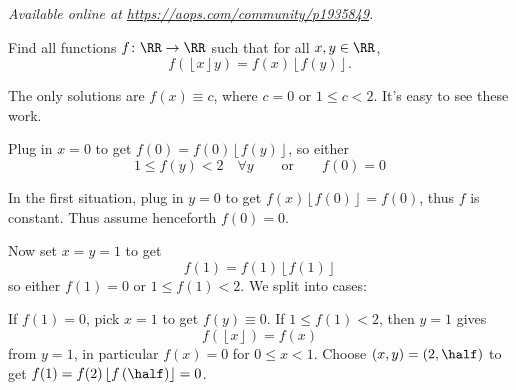\textsl{Available online at \url{https://aops.com/community/p1935849}.}
\begin{mdframed}[style=mdpurplebox,frametitle={Problem statement}]
Find all functions $f \colon \RR \to \RR$ such that for all $x,y \in \RR$,
\[ f(\left\lfloor x\right\rfloor y) = f(x)\left\lfloor f(y)\right\rfloor. \]
\end{mdframed}
The only solutions are $f(x) \equiv c$,
where $c = 0$ or $1 \le c < 2$.
It's easy to see these work.

Plug in $x=0$ to get $f(0) = f(0) \left\lfloor f(y) \right\rfloor$,
so either
\[ 1 \le f(y) < 2 \quad \forall y
  \qquad\text{or}\qquad f(0) = 0 \]

In the first situation,
plug in $y=0$ to get $f(x) \left\lfloor f(0) \right\rfloor = f(0)$,
thus $f$ is constant.
Thus assume henceforth $f(0) = 0$.

Now set $x=y=1$ to get
\[ f(1) = f(1) \left\lfloor f(1) \right\rfloor \]
so either $f(1) = 0$ or $1 \le f(1) < 2$.
We split into cases:
\begin{itemize}
  \ii If $f(1) = 0$, pick $x=1$ to get $f(y) \equiv 0$.
  \ii If $1 \le f(1) < 2$,
  then $y=1$ gives
  \[ f(\left\lfloor x \right\rfloor) = f(x) \]
  from $y=1$, in particular $f(x) = 0$ for $0 \le x < 1$.
  Choose $(x,y) = \left( 2, \half \right)$ to get
  $f(1) = f(2) \left\lfloor f\left( \half \right) \right\rfloor = 0$.
\end{itemize}
\pagebreak